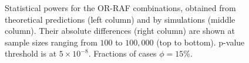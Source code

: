 \begin{figure}[!tpb]
{        } %
\caption{
Statistical powers for the OR-RAF combinations, obtained from theoretical predictions (left column) and by simulations (middle column). Their absolute differences (right column) are shown at sample sizes ranging from $100$ to $100,000$ (top to bottom).
p-value threshold is at $5\times10^{-8}$.
Fractions of cases $\phi=15\%$.
}\label{fig:phi015}
\end{figure}

